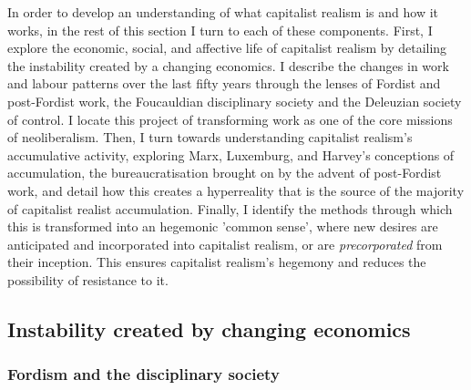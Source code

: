 In order to develop an understanding of what capitalist realism is and how it works, in the rest of this section I turn to each of these components. First, I explore the economic, social, and affective life of capitalist realism by detailing the instability created by a changing economics. I describe the changes in work and labour patterns over the last fifty years through the lenses of Fordist and post-Fordist work, the Foucauldian disciplinary society and the Deleuzian society of control. I locate this project of transforming work as one of the core missions of neoliberalism. Then, I turn towards understanding capitalist realism's accumulative activity, exploring Marx, Luxemburg, and Harvey's conceptions of accumulation, the bureaucratisation brought on by the advent of post-Fordist work, and detail how this creates a hyperreality that is the source of the majority of capitalist realist accumulation. Finally, I identify the methods through which this is transformed into an hegemonic 'common sense', where new desires are anticipated and incorporated into capitalist realism, or are \emph{precorporated} from their inception. This ensures capitalist realism's hegemony and reduces the possibility of resistance to it.

\subsection{Instability created by changing economics}
\label{subsec:2-instability}

\subsubsection{Fordism and the disciplinary society}
\label{subsubsec:fordism-and-the-disciplinary-society}

